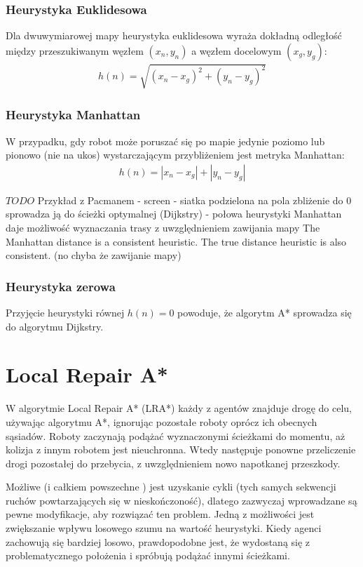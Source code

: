 \subsubsection{Heurystyka Euklidesowa}
Dla dwuwymiarowej mapy heurystyka euklidesowa wyraża dokładną odległość między przeszukiwanym węzłem $(x_n, y_n)$ a węzłem docelowym $(x_g, y_g)$:
\begin{gather}
 	h(n) = \sqrt{(x_n - x_g)^2 + (y_n - y_g)^2}
 	\label{eq_astar_heu_euc} 
\end{gather}

\subsubsection{Heurystyka Manhattan}
W przypadku, gdy robot może poruszać się po mapie jedynie poziomo lub pionowo (nie na ukos) wystarczającym przybliżeniem jest metryka Manhattan:
\begin{gather}
 	h(n) = |x_n - x_g| + |y_n - y_g|
 	\label{eq_astar_heu_man} 
\end{gather}

$TODO$ Przykład z Pacmanem - screen - siatka podzielona na pola
zbliżenie do 0 sprowadza ją do ścieżki optymalnej (Dijkstry) - połowa heurystyki Manhattan daje możliwość wyznaczania trasy z uwzględnieniem zawijania mapy
The Manhattan distance is a consistent heuristic. The true distance heuristic is also consistent. (no chyba że zawijanie mapy)

\subsubsection{Heurystyka zerowa}
Przyjęcie heurystyki równej $h(n) = 0$ powoduje, że algorytm A* sprowadza się do algorytmu Dijkstry.

\section{Local Repair A*}
W algorytmie Local Repair A* (LRA*) każdy z agentów znajduje drogę do celu, używając algorytmu A*, ignorując pozostałe roboty oprócz ich obecnych sąsiadów. Roboty zaczynają podążać wyznaczonymi ścieżkami do momentu, aż kolizja z innym robotem jest nieuchronna. Wtedy następuje ponowne przeliczenie drogi pozostałej do przebycia, z uwzględnieniem nowo napotkanej przeszkody.

Możliwe (i całkiem powszechne \cite{cooppath}) jest uzyskanie cykli (tych samych sekwencji ruchów powtarzających się w nieskończoność), dlatego zazwyczaj wprowadzane są pewne modyfikacje, aby rozwiązać ten problem. Jedną z możliwości jest zwiększanie wpływu losowego szumu na wartość heurystyki. Kiedy agenci zachowują się bardziej losowo, prawdopodobne jest, że wydostaną się z problematycznego położenia i spróbują podążać innymi ścieżkami.

